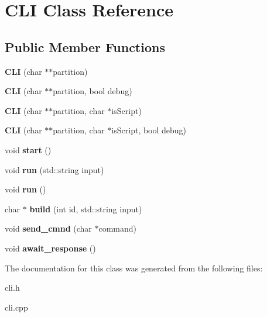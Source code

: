 \hypertarget{classCLI}{}\section{C\+LI Class Reference}
\label{classCLI}
\subsection*{Public Member Functions}
\begin{DoxyCompactItemize}
\item 
\mbox{\label{classCLI_a0c3b5662a3f33b5a76021be177c3eef2}} 
{\bfseries C\+LI} (char $\ast$$\ast$partition)
\item 
\mbox{\label{classCLI_aeafaa56f2b2d8c97121ed52125e3fa9a}} 
{\bfseries C\+LI} (char $\ast$$\ast$partition, bool debug)
\item 
\mbox{\label{classCLI_a4eb5e9a1c695edf4dcc705b9c12a0a8d}} 
{\bfseries C\+LI} (char $\ast$$\ast$partition, char $\ast$is\+Script)
\item 
\mbox{\label{classCLI_a5d9746160fc642addd9b4aff6cc4eef2}} 
{\bfseries C\+LI} (char $\ast$$\ast$partition, char $\ast$is\+Script, bool debug)
\item 
\mbox{\label{classCLI_a1492005f186392031bd4d447cb20e975}} 
void {\bfseries start} ()
\item 
\mbox{\label{classCLI_a5ce3ce0818fc0afe2a277995000ea22b}} 
void {\bfseries run} (std\+::string input)
\item 
\mbox{\label{classCLI_aeefc8cd81999836a90c2cfaced6177f1}} 
void {\bfseries run} ()
\item 
\mbox{\label{classCLI_a2019fb3e1ab4580218d507859883d8dd}} 
char $\ast$ {\bfseries build} (int id, std\+::string input)
\item 
\mbox{\label{classCLI_aba5e2a83a3134c959b1d4fb35c6c72b2}} 
void {\bfseries send\+\_\+cmnd} (char $\ast$command)
\item 
\mbox{\label{classCLI_a87c68e5edcb5750d1199839e6b1f843e}} 
void {\bfseries await\+\_\+response} ()
\end{DoxyCompactItemize}


The documentation for this class was generated from the following files\+:\begin{DoxyCompactItemize}
\item 
cli.\+h\item 
cli.\+cpp\end{DoxyCompactItemize}
